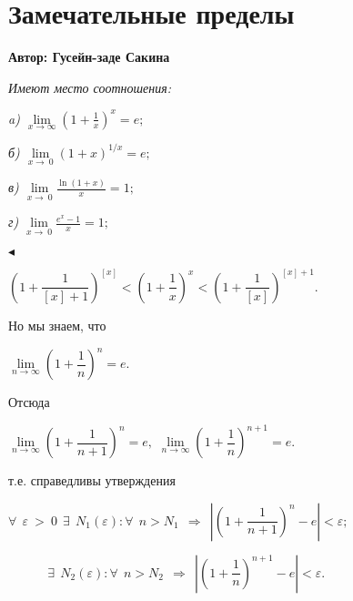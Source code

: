 \setcounter{object}{0}
\setcounter{approval}{0}
\setcounter{theorem}{0}
\setcounter{example}{0}


\chapter{Замечательные пределы}
\centerline{ \bf Автор: Гусейн-заде Сакина } \vskip 1cm

\begin{approval}
\slshape{Имеют место соотношения:}

\slshape{a)}
$\lim\limits_{x\to\infty} (1+\frac{1}{x})^{x}=e;$


\slshape{б)}
$\lim\limits_{x\to\ 0}(1+x)^{1/x} =e;$


\slshape{в)}
$\lim\limits_{x\to\ 0}\frac{\ln(1+x)}{x} =1;$


\slshape{г)}
$\lim\limits_{x\to\ 0}\frac{e^{x}-1}{x} =1;$

\end{approval}

$\blacktriangleleft$
 
 \begin{center}
 $
 \left(1+\dfrac{1}{[x]+1}\right) ^{[x]}<\left(1+\dfrac{1}{x}\right) ^{x}<\left(1+\dfrac{1}{[x]}\right) ^{[x]+1}
 $.
 \end{center}
Но мы знаем, что
 
  \begin{center}
  $
\lim\limits_{n\to\infty}\left(1+\dfrac{1}{n}\right) ^{n}=e.
  $
  \end{center}
Отсюда  
   \begin{center}
   $
 \lim\limits_{n\to\infty}\left(1+\dfrac{1}{n+1}\right)^{n}=e, $   $\lim\limits_{n\to\infty}\left(1+\dfrac{1}{n}\right)^{n+1}=e.
   $
   \end{center}
т.е. справедливы утверждения
   \begin{center}
   $
\forall\: \: \varepsilon\: >\: 0   \:\:  \exists \:\:  N_1(\varepsilon ):\forall\: \:  n>N_1 \: \: \Rightarrow \: \:  \left | \left(1+\dfrac{1}{n+1}\right)^{n}-e \right |<\varepsilon ;
   $
   
   $
\:\:\:\:\:\:\:\:\:\:\:\:\:\:  \exists \:\:  N_2(\varepsilon ):\forall\: \:  n>N_2 \: \: \Rightarrow \: \:  \left | \left(1+\dfrac{1}{n}\right)^{n+1}-e \right |<\varepsilon.
   $
\end{center}

